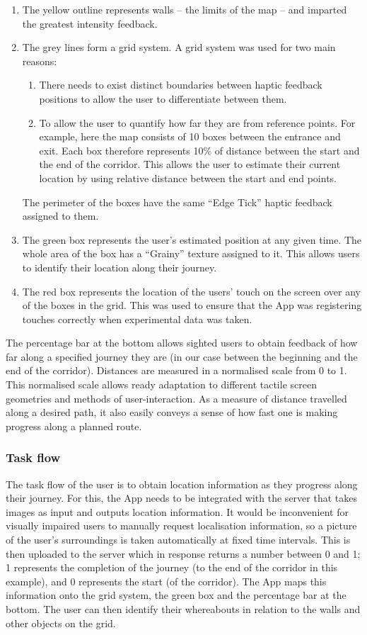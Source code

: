 \begin{enumerate}
  \item The yellow outline represents walls -- the limits of the map -- and imparted the greatest intensity feedback.
  \item The grey lines form a grid system. A grid system was used for two main reasons:
  \begin{enumerate}
  \item There needs to exist distinct boundaries between haptic feedback positions to allow the user to differentiate between them.
  \item To allow the user to quantify how far they are from reference points. For example, here the map consists of 10 boxes between the entrance and exit. Each box therefore represents 10\% of distance between the start and the end of the corridor. This allows the user to estimate their current location by using relative distance between the start and end points.
  \end{enumerate}
  The perimeter of the boxes have the same ``Edge Tick'' haptic feedback assigned to them.
  \item The green box represents the user's estimated position at any given time. The whole area of the box has a ``Grainy'' texture assigned to it. This allows users to identify their location along their journey.
  \item The red box represents the location of the users' touch on the screen over any of the boxes in the grid. This was used to ensure that the App was registering touches correctly when experimental data was taken.
\end{enumerate} 

The percentage bar at the bottom allows sighted users to obtain feedback of how far along a specified journey they are (in our case between the beginning and the end of the corridor). Distances are measured in a normalised scale from 0 to 1. This normalised scale allows ready adaptation to different tactile screen geometries and methods of user-interaction. As a measure of distance travelled along a desired path, it also easily conveys a sense of how fast one is making progress along a planned route.


\subsubsection{Task flow}
\label{sec:task_flow}
The task flow of the user is to obtain location information as they progress along their journey. For this, the App needs to be integrated with the server that takes images as input and outputs location information. It would be inconvenient for visually impaired users to manually request localisation information, so a picture of the user's surroundings is taken automatically at fixed time intervals. This is then uploaded to the server which in response returns a number between 0 and 1; 1 represents the completion of the journey (to the end of the corridor in this example), and 0 represents the start (of the corridor). The App maps this information onto the grid system, the green box and the percentage bar at the bottom. The user can then identify their whereabouts in relation to the walls and other objects on the grid.
 
